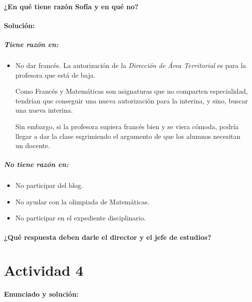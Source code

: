 \paragraph{¿En qué tiene razón Sofía y en qué no?}

\paragraph{Solución: }

\subparagraph{Tiene razón en:}

\begin{itemize}
	\item No dar francés.
 La autorización de la \textit{Dirección de Área Territorial} es para la profesora que está de baja.
 
	Como Francés y Matemáticas son asignaturas que no comparten especialidad, tendrían que conseguir una nueva autorización para la interina, y sino, buscar una nueva interina.


	Sin embargo, si la profesora supiera francés bien y se viera cómoda, podría llegar a dar la clase esgrimiendo el argumento de que los alumnos necesitan un docente.

\end{itemize}


\subparagraph{No tiene razón en:}

\begin{itemize}
	\item No participar del blog.

	\item No ayudar con la olimpiada de Matemáticas.

	\item No participar en el expediente disciplinario.

\end{itemize}


\paragraph{¿Qué respuesta deben darle el director y el jefe de estudios?}



\newpage
\section*{Actividad 4}
\paragraph{Enunciado y solución:}


